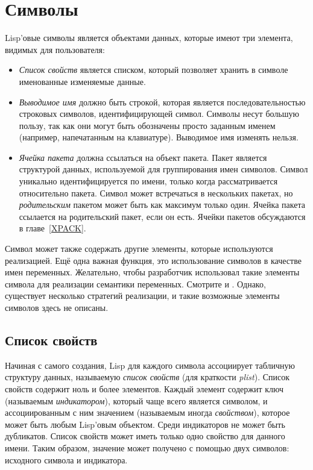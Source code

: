 \else

\chapter{Символы}
\label{symbol}

Lisp'овые символы является объектами данных, которые имеют три элемента, видимых
для пользователя:
\begin{itemize}
\item
\emph{Список свойств} является списком, который позволяет хранить в символе
именованные изменяемые данные.

\item
\emph{Выводимое имя} должно быть строкой, которая является последовательностью
строковых символов, идентифицирующей символ. Символы несут большую пользу, так
как они могут быть обозначены просто заданным именем (например, напечатанным на
клавиатуре).
Выводимое имя изменять нельзя.

\item
\emph{Ячейка пакета} должна ссылаться на объект пакета.
Пакет является структурой данных, используемой для группирования имен символов.
Символ уникально идентифицируется по имени, только когда рассматривается
относительно пакета. Символ может встречаться в нескольких пакетах, но
\emph{родительским} пакетом может быть как максимум только один.
Ячейка пакета ссылается на родительский пакет, если он есть.
Ячейки пакетов обсуждаются в главе~\ref{XPACK}.
\end{itemize}

Символ может также содержать другие элементы, которые используются
реализацией. Ещё одна важная функция, это использование символов в качестве
имен переменных.  Желательно, чтобы разработчик использовал такие элементы
символа для реализации семантики переменных. Смотрите  и
. Однако, существует несколько стратегий реализации, и
такие возможные элементы символов здесь не описаны.

\section{Список свойств}

Начиная с самого создания, Lisp для каждого символа ассоциирует табличную
структуру данных, называемую \emph{список свойств} (для краткости \emph{plist}).
Список свойств содержит ноль и более элементов. Каждый элемент содержит ключ
(называемым \emph{индикатором}), который чаще всего является символом, и
ассоциированным с ним значением (называемым иногда \emph{свойством}), которое
может быть любым Lisp'овым объектом.
Среди индикаторов не может быть дубликатов. Список свойств может иметь только
одно свойство для данного имени. Таким образом, значение может получено с
помощью двух символов: исходного символа и индикатора.

